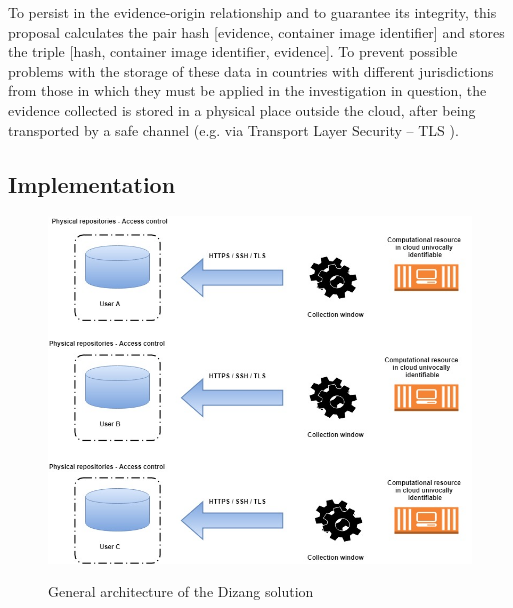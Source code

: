\documentclass[conference]{IEEEtran}
\newcommand{\fancyname}{Dizang }
\begin{document}
To persist in the evidence-origin relationship and to guarantee its integrity, this proposal calculates the pair hash [evidence, container image identifier] and stores the triple [hash, container image identifier, evidence].
%
To prevent possible problems with the storage of these data in countries with different jurisdictions from those in which they must be applied in the investigation in question, the evidence collected is stored in a physical place outside the cloud, after being transported by a safe channel (e.g. via Transport Layer Security – TLS \cite{DierksT2008}).
%

\subsection{Implementation}
\label{sec:proposal-impl}

\begin{figure}[htb!]
\footnotesize
\caption{General architecture of the \fancyname solution}
\includegraphics[scale=0.31]{solucao-eng.jpg}
\centering
\label{fig:Solucao}
\end{figure}
\end{document}

